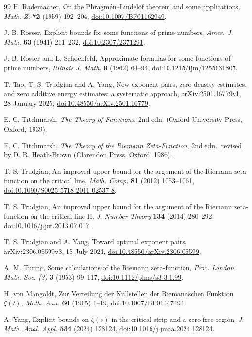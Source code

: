 \documentclass[11pt,reqno]{amsart}
\numberwithin{equation}{section}
\theoremstyle{definition}
\theoremstyle{remark}
\begin{document}
\begin{thebibliography}{99}
 H. Rademacher, On the Phragm\'en--Lindel\"of theorem and some applications, \textit{Math. Z.} \textbf{72} (1959) 192--204, \href{https://doi.org/10.1007/BF01162949}{doi:10.1007/BF01162949}.

 J. B. Rosser, Explicit bounds for some functions of prime numbers, \textit{Amer. J. Math.} \textbf{63} (1941) 211--232, \href{https://doi.org/10.2307/2371291}{doi:10.2307/2371291}.

 J. B. Rosser and L. Schoenfeld, Approximate formulas for some functions of prime numbers, \textit{Illinois J. Math.} \textbf{6} (1962) 64--94, \href{https://doi.org/10.1215/ijm/1255631807}{doi:10.1215/ijm/1255631807}.

 T. Tao, T. S. Trudgian and A. Yang, New exponent pairs, zero density estimates, and zero additive energy estimates: a systematic approach, arXiv:2501.16779v1, 28 January 2025, \href{https://doi.org/10.48550/arXiv.2501.16779}{doi:10.48550/arXiv.2501.16779}.

 E. C. Titchmarsh, \textit{The Theory of Functions}, 2nd edn. (Oxford University Press, Oxford, 1939).

 E. C. Titchmarsh, \textit{The Theory of the Riemann Zeta-Function}, 2nd edn., revised by D. R. Heath-Brown (Clarendon Press, Oxford, 1986).

 T. S. Trudgian, An improved upper bound for the argument of the Riemann zeta-function on the critical line, \textit{Math. Comp.} \textbf{81} (2012) 1053--1061, \href{https://doi.org/10.1090/S0025-5718-2011-02537-8}{doi:10.1090/S0025-5718-2011-02537-8}.

 T. S. Trudgian, An improved upper bound for the argument of the Riemann zeta-function on the critical line II, \textit{J. Number Theory} \textbf{134} (2014) 280--292, \href{https://doi.org/10.1016/j.jnt.2013.07.017}{doi:10.1016/j.jnt.2013.07.017}.

 T. S. Trudgian and A. Yang, Toward optimal exponent pairs, arXiv:2306.05599v3, 15 July 2024, \href{https://doi.org/10.48550/arXiv.2306.05599}{doi:10.48550/arXiv.2306.05599}.

 A. M. Turing, Some calculations of the Riemann zeta-function, \textit{Proc. London Math. Soc. (3)} \textbf{3} (1953) 99--117, \href{https://doi.org/10.1112/plms/s3-3.1.99}{doi:10.1112/plms/s3-3.1.99}.

 H. von Mangoldt, Zur Verteilung der Nullstellen der Riemannschen Funktion $\xi(t)$, \textit{Math. Ann.} \textbf{60} (1905) 1--19, \href{https://doi.org/10.1007/BF01447494}{doi:10.1007/BF01447494}.

 A. Yang, Explicit bounds on $\zeta(s)$ in the critical strip and a zero-free region, \textit{J. Math. Anal. Appl.} \textbf{534} (2024) 128124, \href{https://doi.org/10.1016/j.jmaa.2024.128124}{doi:10.1016/j.jmaa.2024.128124}.

\end{thebibliography}
\end{document}
